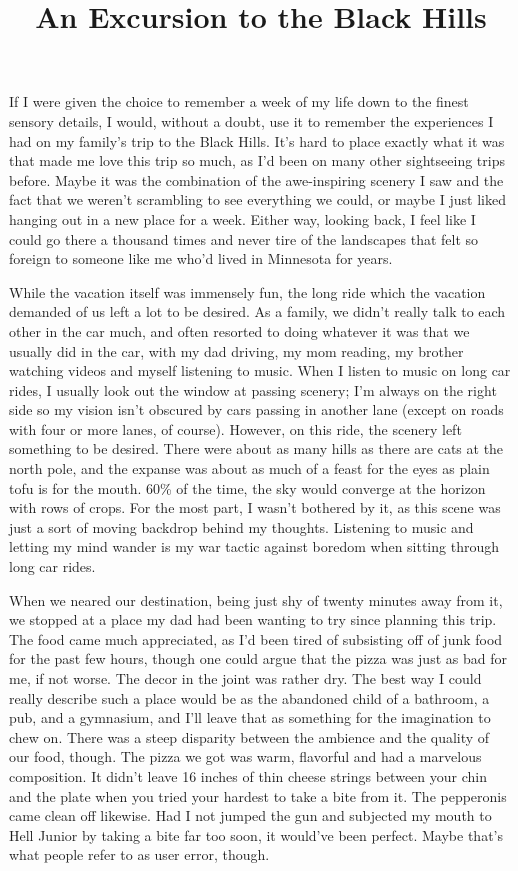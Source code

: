 \documentclass[12pt]{article}
\title{An Excursion to the Black Hills}
\begin{document}
\makeheader
\hspace{0.5in}
If I were given the choice to remember a week of my life down to the finest sensory details, I would, without a doubt, use it to remember the experiences I had on my family's trip to the Black Hills.  It's hard to place exactly what it was that made me love this trip so much, as I'd been on many other sightseeing trips before.  Maybe it was the combination of the awe-inspiring scenery I saw and the fact that we weren't scrambling to see everything we could, or maybe I just liked hanging out in a new place for a week.  Either way, looking back, I feel like I could go there a thousand times and never tire of the landscapes that felt so foreign to someone like me who'd lived in Minnesota for years.

While the vacation itself was immensely fun, the long ride which the vacation demanded of us left a lot to be desired.  As a family, we didn't really talk to each other in the car much, and often resorted to doing whatever it was that we usually did in the car, with my dad driving, my mom reading, my brother watching videos and myself listening to music.  When I listen to music on long car rides, I usually look out the window at passing scenery;  I'm always on the right side so my vision isn't obscured by cars passing in another lane (except on roads with four or more lanes, of course).  However, on this ride, the scenery left something to be desired.  There were about as many hills as there are cats at the north pole, and the expanse was about as much of a feast for the eyes as plain tofu is for the mouth.  60\% of the time, the sky would converge at the horizon with rows of crops.  For the most part, I wasn't bothered by it, as this scene was just a sort of moving backdrop behind my thoughts.  Listening to music and letting my mind wander is my war tactic against boredom when sitting through long car rides.

When we neared our destination, being just shy of twenty minutes away from it, we stopped at a place my dad had been wanting to try since planning this trip.  The food came much appreciated, as I'd been tired of subsisting off of junk food for the past few hours, though one could argue that the pizza was just as bad for me, if not worse.  The decor in the joint was rather dry.  The best way I could really describe such a place would be as the abandoned child of a bathroom, a pub, and a gymnasium, and I'll leave that as something for the imagination to chew on.  There was a steep disparity between the ambience and the quality of our food, though.  The pizza we got was warm, flavorful and had a marvelous composition.  It didn't leave 16 inches of thin cheese strings between your chin and the plate when you tried your hardest to take a bite from it.  The pepperonis came clean off likewise.  Had I not jumped the gun and subjected my mouth to Hell Junior by taking a bite far too soon, it would've been perfect.  Maybe that's what people refer to as user error, though.
\end{document}
